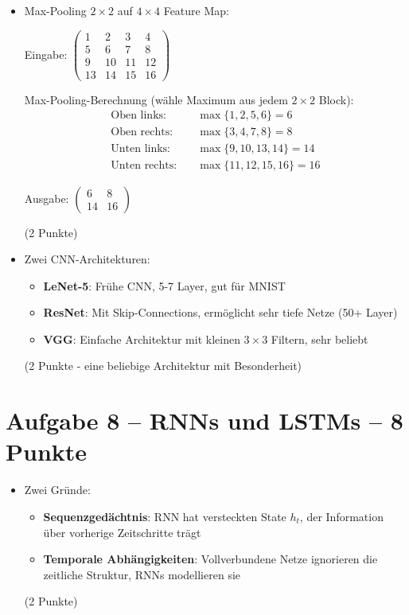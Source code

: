 \begin{itemize}
\item [c)] Max-Pooling $2 \times 2$ auf $4 \times 4$ Feature Map:

Eingabe: $\begin{pmatrix} 1 & 2 & 3 & 4 \\ 5 & 6 & 7 & 8 \\ 9 & 10 & 11 & 12 \\ 13 & 14 & 15 & 16 \end{pmatrix}$

Max-Pooling-Berechnung (wähle Maximum aus jedem $2 \times 2$ Block):
\begin{align*}
\text{Oben links:} \quad & \max\{1, 2, 5, 6\} = 6 \\
\text{Oben rechts:} \quad & \max\{3, 4, 7, 8\} = 8 \\
\text{Unten links:} \quad & \max\{9, 10, 13, 14\} = 14 \\
\text{Unten rechts:} \quad & \max\{11, 12, 15, 16\} = 16
\end{align*}

Ausgabe: $\begin{pmatrix} 6 & 8 \\ 14 & 16 \end{pmatrix}$

(2 Punkte)
\end{itemize}

\begin{itemize}
\item [d)] Zwei CNN-Architekturen:
\begin{itemize}
  \item \textbf{LeNet-5}: Frühe CNN, 5-7 Layer, gut für MNIST
  \item \textbf{ResNet}: Mit Skip-Connections, ermöglicht sehr tiefe Netze (50+ Layer)
  \item \textbf{VGG}: Einfache Architektur mit kleinen $3 \times 3$ Filtern, sehr beliebt
\end{itemize}
(2 Punkte - eine beliebige Architektur mit Besonderheit)
\end{itemize}

\newpage

\section*{Aufgabe 8 -- RNNs und LSTMs -- 8 Punkte}

\begin{itemize}
\item [a)] Zwei Gründe:
\begin{itemize}
  \item \textbf{Sequenzgedächtnis}: RNN hat versteckten State $h_t$, der Information über vorherige Zeitschritte trägt
  \item \textbf{Temporale Abhängigkeiten}: Vollverbundene Netze ignorieren die zeitliche Struktur, RNNs modellieren sie
\end{itemize}
(2 Punkte)
\end{itemize}

